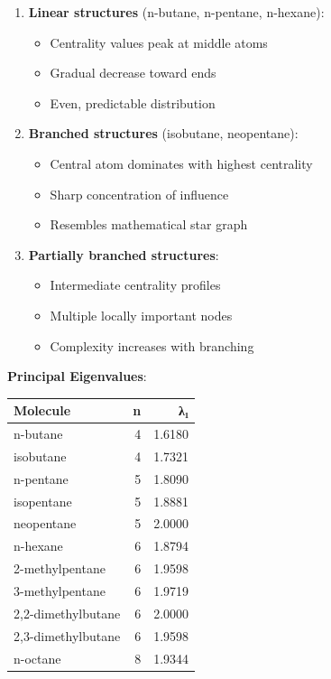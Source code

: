 \documentclass[12pt]{article}
\begin{document}
\begin{enumerate}
    \item \textbf{Linear structures} (n-butane, n-pentane, n-hexane):
    \begin{itemize}
        \item Centrality values peak at middle atoms
        \item Gradual decrease toward ends
        \item Even, predictable distribution
    \end{itemize}
    
    \item \textbf{Branched structures} (isobutane, neopentane):
    \begin{itemize}
        \item Central atom dominates with highest centrality
        \item Sharp concentration of influence
        \item Resembles mathematical star graph
    \end{itemize}
    
    \item \textbf{Partially branched structures}:
    \begin{itemize}
        \item Intermediate centrality profiles
        \item Multiple locally important nodes
        \item Complexity increases with branching
    \end{itemize}
\end{enumerate}

\textbf{Principal Eigenvalues}:

\begin{table}[H]
\centering
\begin{tabular}{|l|r|r|}
\hline
\textbf{Molecule} & \textbf{n} & \textbf{λ₁} \\
\hline
n-butane & 4 & 1.6180 \\
isobutane & 4 & 1.7321 \\
n-pentane & 5 & 1.8090 \\
isopentane & 5 & 1.8881 \\
neopentane & 5 & 2.0000 \\
n-hexane & 6 & 1.8794 \\
2-methylpentane & 6 & 1.9598 \\
3-methylpentane & 6 & 1.9719 \\
2,2-dimethylbutane & 6 & 2.0000 \\
2,3-dimethylbutane & 6 & 1.9598 \\
n-octane & 8 & 1.9344 \\
\hline
\end{tabular}
\end{table}
\end{document}
